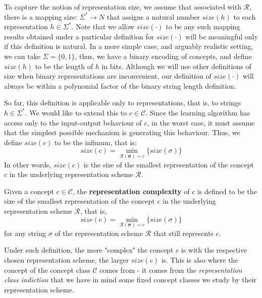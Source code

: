 To capture the notion of representation size, we assume that associated with $\bm{\mathcal{R}}$, there is a mapping size: $\Sigma^{*}\to N$ that assigns a natural number $size(h)$ to each representation $h\in \Sigma^{*}$. Note that we allow $size(\cdot)$ to be any such mapping results obtained under a particular definition for $size(\cdot)$ will be meaningful only if this definition is natural. In a more simple case, and arguably realistic setting, we can take $\Sigma=\{0,1\}$, thus, we have a binary encoding of concepts, and define $size(h)$ to be the length of $h$ in bits. Although we will use other definitions of size when binary representations are inconvenient, our definition of $size(\cdot)$ will always be within a polynomial factor of the binary string length definition.

So far, this definition is applicable only to representations, that is, to strings $h\in \Sigma^{*}$. We would like to extend this to $c\in \mathcal{C}$. Since the learning algorithm has access only to the input-output behaviour of $c$, in the worst case, it must assume that the simplest possible mechanism is generating this behaviour. Thus, we define $size(c)$ to be the infimum, that is:  \begin{equation*}
    size(c) = \min_{\bm{\mathcal{R}(\sigma)}=c}\{size(\sigma)\}
\end{equation*}
In other words, $size(c)$ is the size of the smallest representation of the concept $c$ in the underlying representation scheme $\bm{\mathcal{R}}$. 
\begin{definition}
    Given a concept $c\in\mathcal{C}$, the \textbf{representation complexity} of $c$ is defined to be the size of the smallest representation of the concept $c$ in the underlying representation scheme $\bm{\mathcal{R}}$, that is, 
    \begin{equation*}
    size(c) = \min_{\bm{\mathcal{R}(\sigma)}=c}\{size(\sigma)\}
\end{equation*}
for any string $\sigma$ of the representation scheme $\bm{\mathcal{R}}$ that still represents $c$.
\end{definition}
Under such definition, the more "complex" the concept $c$ is with the respective chosen representation scheme, the larger $size(c)$ is. This is also where the concept of the concept class $\mathcal{C}$ comes from - it comes from the \textit{representation class indiction} that we have in mind some fixed concept classes we study by their representation scheme. 

